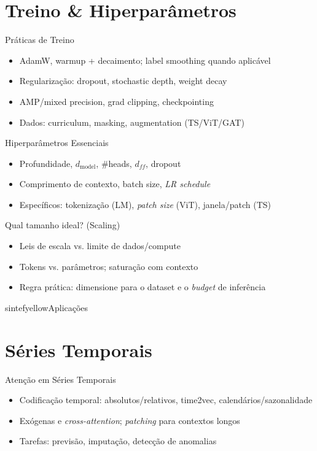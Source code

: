 \documentclass{beamer}
\begin{document}
\section{Treino \& Hiperparâmetros}
\begin{frame}{Práticas de Treino}
\begin{itemize}[<+->]
  \item AdamW, warmup + decaimento; label smoothing quando aplicável
  \item Regularização: dropout, stochastic depth, weight decay
  \item AMP/mixed precision, grad clipping, checkpointing
  \item Dados: curriculum, masking, augmentation (TS/ViT/GAT)
\end{itemize}
\end{frame}

\begin{frame}{Hiperparâmetros Essenciais}
\begin{itemize}[<+->]
  \item Profundidade, $d_{\text{model}}$, \#heads, $d_{ff}$, dropout
  \item Comprimento de contexto, batch size, \textit{LR schedule}
  \item Específicos: tokenização (LM), \textit{patch size} (ViT), janela/patch (TS)
\end{itemize}
\end{frame}

\begin{frame}{Qual tamanho ideal? (Scaling)}
\begin{itemize}[<+->]
  \item Leis de escala vs. limite de dados/compute
  \item Tokens vs. parâmetros; saturação com contexto
  \item Regra prática: dimensione para o dataset e o \textit{budget} de inferência
\end{itemize}
\end{frame}

\begin{chapter}{sintefyellow}{Aplicações}\end{chapter}

\section{Séries Temporais}
\begin{frame}{Atenção em Séries Temporais}
\begin{itemize}[<+->]
  \item Codificação temporal: absolutos/relativos, time2vec, calendários/sazonalidade
  \item Exógenas e \textit{cross-attention}; \textit{patching} para contextos longos
  \item Tarefas: previsão, imputação, detecção de anomalias
\end{itemize}
\end{frame}
\end{document}
